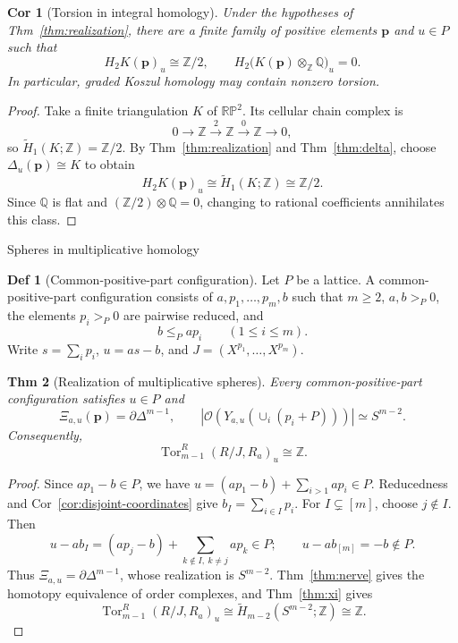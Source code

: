 \documentclass[10pt,letterpaper]{amsart}
\makeatletter
\numberwithin{equation}{section}
\newtheorem{thm}{Thm}[section]
\newtheorem{cor}[thm]{Cor}
\theoremstyle{definition}
\newtheorem{defn}{Def}[section]
\newcommand{\Z}{\mathbb Z}
\newcommand{\Q}{\mathbb Q}
\newcommand{\Tor}{\operatorname{Tor}}
\newcommand{\ord}{\mathcal O}
\def\subsection{\@startsection{subsection}{2}
  \z@{.9\linespacing\@plus.3\linespacing}{.4\linespacing}
  {\normalfont\fontsize{11.5}{14}\selectfont\bfseries\boldmath\raggedright}}
\makeatother
\begin{document}
\begin{cor}[Torsion in integral homology]\label{cor:torsion}
Under the hypotheses of Thm~\ref{thm:realization}, there are a finite family of positive elements $\mathbf p$ and $u\in P$ such that
\[
H_2K(\mathbf p)_u\cong\Z/2,\qquad
H_2\bigl(K(\mathbf p)\otimes_{\Z}\Q\bigr)_u=0.
\]
In particular, graded Koszul homology may contain nonzero torsion.
\end{cor}
\begin{proof}
Take a finite triangulation $K$ of $\mathbb{RP}^2$. Its cellular chain complex is
\[
0\longrightarrow\Z\xrightarrow{\,2\,}\Z\xrightarrow{\,0\,}\Z\longrightarrow0,
\]
so $\widetilde H_1(K;\Z)=\Z/2$. By Thm~\ref{thm:realization} and Thm~\ref{thm:delta}, choose $\Delta_u(\mathbf p)\cong K$ to obtain
\[
H_2K(\mathbf p)_u\cong\widetilde H_1(K;\Z)\cong\Z/2.
\]
Since $\Q$ is flat and $(\Z/2)\otimes\Q=0$, changing to rational coefficients annihilates this class.
\end{proof}

\subsection{Spheres in multiplicative homology}
\begin{defn}[Common-positive-part configuration]\label{def:sphere-config}
Let $P$ be a lattice. A common-positive-part configuration consists of $a,p_1,\ldots,p_m,b$ such that $m\ge2$, $a,b>_P0$, the elements $p_i>_P0$ are pairwise reduced, and
\[
b\le_Pap_i\qquad(1\le i\le m).
\]
Write $s=\sum_i p_i$, $u=as-b$, and $J=(X^{p_1},\ldots,X^{p_m})$.
\end{defn}

\begin{thm}[Realization of multiplicative spheres]\label{thm:sphere}
Every common-positive-part configuration satisfies $u\in P$ and
\[
\Xi_{a,u}(\mathbf p)=\partial\Delta^{m-1},\qquad
|\ord(Y_{a,u}(\cup_i(p_i+P)))|\simeq S^{m-2}.
\]
Consequently,
\[
\Tor_{m-1}^R(R/J,R_a)_u\cong\Z.
\]
\end{thm}
\begin{proof}
Since $ap_1-b\in P$, we have $u=(ap_1-b)+\sum_{i>1}ap_i\in P$. Reducedness and Cor~\ref{cor:disjoint-coordinates} give $b_I=\sum_{i\in I}p_i$. For $I\subsetneq[m]$, choose $j\notin I$. Then
\[
u-ab_I=(ap_j-b)+\sum_{k\notin I,\ k\ne j}ap_k\in P;
\qquad u-ab_{[m]}=-b\notin P.
\]
Thus $\Xi_{a,u}=\partial\Delta^{m-1}$, whose realization is $S^{m-2}$. Thm~\ref{thm:nerve} gives the homotopy equivalence of order complexes, and Thm~\ref{thm:xi} gives
\[
\Tor_{m-1}^R(R/J,R_a)_u
\cong\widetilde H_{m-2}(S^{m-2};\Z)\cong\Z.
\]
\end{proof}
\end{document}
